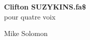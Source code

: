 \documentclass[a4paper]{book}
\begin{document}
\begin{titlepage}
\begin{flushright}
{\Huge \bfseries Clifton SUZYKINS.fa\$ \\ }
{\large pour quatre voix \\}
\par
{}
{\Large Mike Solomon}
\end{flushright}
\end{titlepage}
\thispagestyle{empty} 
\frontmatter
\clearpage
\end{document}

